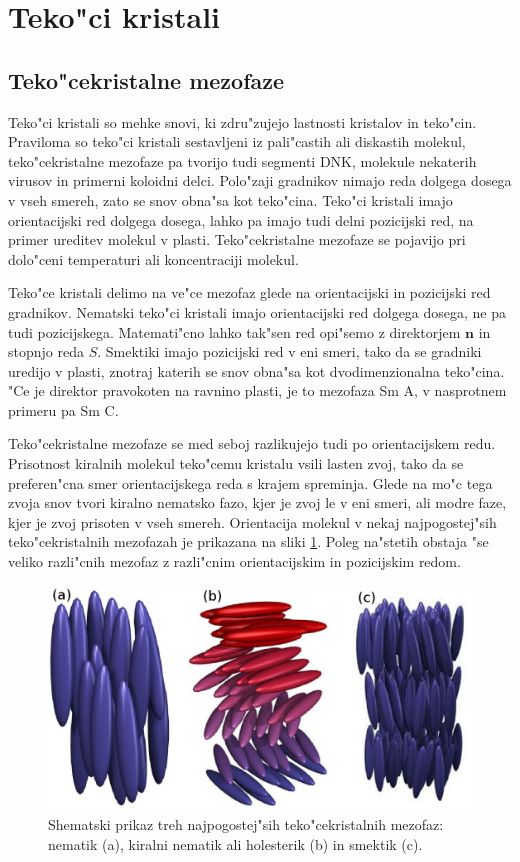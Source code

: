 \documentclass[a4paper,10pt]{article}
\begin{document}
\section{Teko"ci kristali}

\subsection{Teko"cekristalne mezofaze}

Teko"ci kristali so mehke snovi, ki zdru"zujejo lastnosti kristalov in teko"cin\cite{degennes}. 
Praviloma so teko"ci kristali sestavljeni iz pali"castih ali diskastih molekul, teko"cekristalne mezofaze pa tvorijo tudi segmenti DNK, molekule nekaterih virusov in primerni koloidni delci. 
Polo"zaji gradnikov nimajo reda dolgega dosega v vseh smereh, zato se snov obna"sa kot teko"cina. 
Teko"ci kristali imajo orientacijski red dolgega dosega, lahko pa imajo tudi delni pozicijski red, na primer ureditev molekul v plasti. 
Teko"cekristalne mezofaze se pojavijo pri dolo"ceni temperaturi ali koncentraciji molekul. 

Teko"ce kristali delimo na ve"ce mezofaz glede na orientacijski in pozicijski red gradnikov. Nematski teko"ci kristali imajo orientacijski red dolgega dosega, ne pa tudi pozicijskega. 
Matemati"cno lahko tak"sen red opi"semo z direktorjem $\mathbf{n}$ in stopnjo reda $S$. 
Smektiki imajo pozicijski red v eni smeri, tako da se gradniki uredijo v plasti, znotraj katerih se snov obna"sa kot dvodimenzionalna teko"cina. 
"Ce je direktor pravokoten na ravnino plasti, je to mezofaza Sm A, v nasprotnem primeru pa Sm C. 

Teko"cekristalne mezofaze se med seboj razlikujejo tudi po orientacijskem redu. 
Prisotnost kiralnih molekul teko"cemu kristalu vsili lasten zvoj, tako da se preferen"cna smer orientacijskega reda s krajem spreminja. 
Glede na mo"c tega zvoja snov tvori kiralno nematsko fazo, kjer je zvoj le v eni smeri, ali modre faze, kjer je zvoj prisoten v vseh smereh. 
Orientacija molekul v nekaj najpogostej"sih teko"cekristalnih mezofazah je prikazana na sliki \ref{fig:faze}. 
Poleg na"stetih obstaja "se veliko razli"cnih mezofaz z razli"cnim orientacijskim in pozicijskim redom. 

\begin{figure}[h]
\centering
  \includegraphics[width=.8\textwidth]{./Slike/faze}
 \caption{Shematski prikaz treh najpogostej"sih teko"cekristalnih mezofaz: nematik (a), kiralni nematik ali holesterik (b) in smektik (c)\cite{wiki:lc}.}
  \label{fig:faze}
\end{figure}
\end{document}
